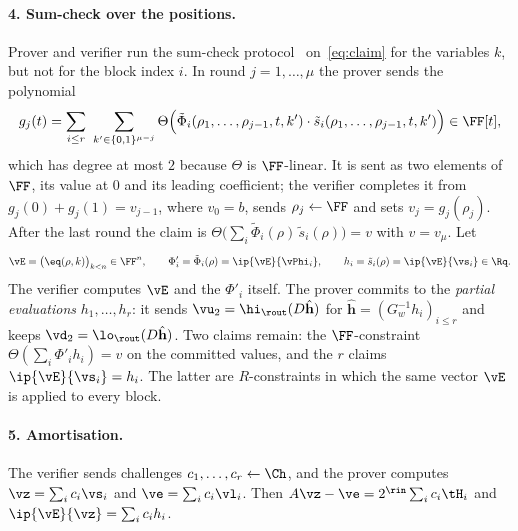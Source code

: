 \paragraph{4. Sum-check over the positions.}
Prover and verifier run the sum-check protocol~\cite{LFKN92} on~\eqref{eq:claim} for the variables $k$, but not for the block index $i$. In round $j=1,\dots,\mu$ the prover sends the polynomial
\[
g_j(t)=\sum_{i\le r}\ \sum_{k'\in\{0,1\}^{\mu-j}}\Theta\Bigl(\tilde\Phi_i(\rho_1,\dots,\rho_{j-1},t,k')\cdot\tilde s_i(\rho_1,\dots,\rho_{j-1},t,k')\Bigr)\in\FF[t] ,
\]
which has degree at most $2$ because $\Theta$ is $\FF$-linear. It is sent as two elements of $\FF$, its value at $0$ and its leading coefficient; the verifier completes it from $g_j(0)+g_j(1)=v_{j-1}$, where $v_0=b$, sends $\rho_j\leftarrow\FF$ and sets $v_j=g_j(\rho_j)$. After the last round the claim is $\Theta\bigl(\sum_i\tilde\Phi_i(\rho)\,\tilde s_i(\rho)\bigr)=v$ with $v=v_\mu$. Let
\[
\vE=\bigl(\eq(\rho,k)\bigr)_{k<n}\in\FF^n,\qquad\Phi'_i=\tilde\Phi_i(\rho)=\ip{\vE}{\vPhi_i},\qquad h_i=\tilde s_i(\rho)=\ip{\vE}{\vs_i}\in\Rq .
\]
The verifier computes $\vE$ and the $\Phi'_i$ itself. The prover commits to the \emph{partial evaluations} $h_1,\dots,h_r$: it sends $\vu_2=\hi_{\rout}(D\hat{\mathbf h})$ for $\hat{\mathbf h}=(G_w^{-1}h_i)_{i\le r}$ and keeps $\vd_2=\lo_{\rout}(D\hat{\mathbf h})$. Two claims remain: the $\FF$-constraint $\Theta(\sum_i\Phi'_ih_i)=v$ on the committed values, and the $r$ claims $\ip{\vE}{\vs_i}=h_i$. The latter are $R$-constraints in which the same vector $\vE$ is applied to every block.

\paragraph{5. Amortisation.}
The verifier sends challenges $c_1,\dots,c_r\leftarrow\Ch$, and the prover computes $\vz=\sum_ic_i\vs_i$ and $\ve=\sum_ic_i\vl_i$. Then $A\vz-\ve=2^{\rin}\sum_ic_i\tH_i$ and $\ip{\vE}{\vz}=\sum_ic_ih_i$.

